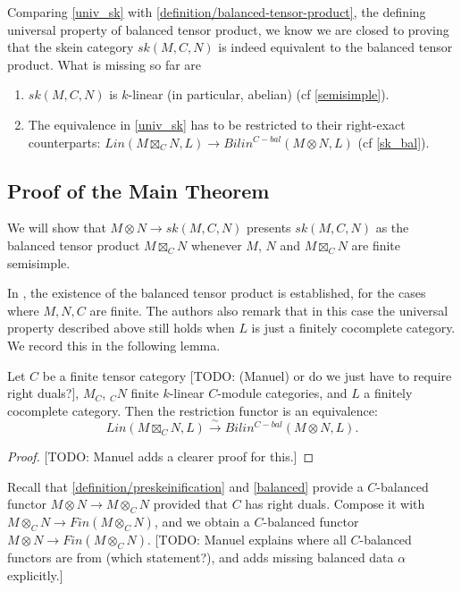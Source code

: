 \begin{remark}
  Comparing \ref{univ_sk} with \ref{definition/balanced-tensor-product}, the defining universal property of balanced tensor product, we know we are closed to proving that the skein category $sk(M,C,N)$ is indeed equivalent to the balanced tensor product. What is missing so far are
  \begin{enumerate}
    \item $sk(M,C,N)$ is $k$-linear (in particular, abelian) (cf \ref{semisimple}).
    \item The equivalence in \ref{univ_sk} has to be restricted to their
          right-exact counterparts:
          $Lin(M \boxtimes_{C} N, L) \to Bilin^{C-bal}(M \otimes N, L)$ (cf \ref{sk_bal}).
  \end{enumerate}
\end{remark}

\subsection{Proof of the Main Theorem}

We will show that $M\otimes N\to sk(M,C,N)$ presents
$sk(M,C,N)$ as the balanced tensor product $M\boxtimes_C N$ whenever $M$, $N$
and $M\boxtimes_C N$ are finite semisimple.

In \cite{douglas/balanced-product}, the existence of the balanced tensor
product is established, for the cases where $M,N,C$ are finite. The authors also remark that
in this case the universal property described above still holds when $L$ is
just a finitely cocomplete category. We record this in the following lemma.

\begin{lemma}\label{univ_box}
  Let $C$ be a finite tensor category [TODO: (Manuel) or do we just have to require right duals?], $M_C$, $_{C}N$ finite $k$-linear $C$-module
  categories, and $L$ a finitely cocomplete category. Then the restriction
  functor is an equivalence: \[Lin(M \boxtimes_{C} N, L) \xrightarrow{\sim} Bilin^{C-bal}(M \otimes N, L).\]
\end{lemma}

\begin{proof}
  \cite[Remark 3.4]{douglas/balanced-product} [TODO: Manuel adds a clearer proof for this.]
\end{proof}

Recall that \ref{definition/preskeinification} and \ref{balanced} provide a $C$-balanced functor $M\otimes N \to M\otimes_C N$
provided that $C$ has right duals. Compose it with $M\otimes_C N \to Fin(M\otimes_C N)$, and
we obtain a $C$-balanced functor $M\otimes N\to Fin(M\otimes_C N)$. [TODO: Manuel explains
where all $C$-balanced functors are from (which statement?), and adds missing
balanced data $\alpha$ explicitly.]

